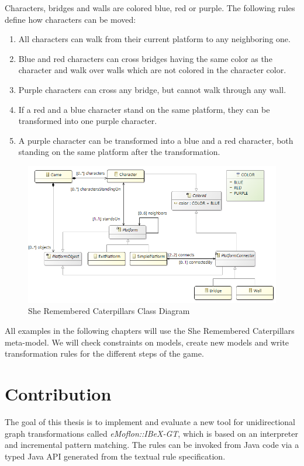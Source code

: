 Characters, bridges and walls are colored blue, red or purple. 
The following rules define how characters can be moved:
\begin{enumerate}
	\item All characters can walk from their current platform to any neighboring one.
	\item Blue and red characters can cross bridges having the same color as the character and walk over walls which are not colored in the character color.
	\item Purple characters can cross any bridge, but cannot walk through any wall.
	\item If a red and a blue character stand on the same platform, they can be transformed into one purple character.
	\item A purple character can be transformed into a blue and a red character, both standing on the same platform after the transformation.
\end{enumerate} 

\begin{figure}[h!]
	\centering
		\includegraphics[width=.9\linewidth]{../common/figures/she-remembered-caterpillars-class-diagram}
	\caption{She Remembered Caterpillars Class Diagram}
	\label{fig:she-remembered-caterpillars-class-diagram}
\end{figure}

\noindent
All examples in the following chapters will use the She Remembered Caterpillars meta-model.
We will check constraints on models, create new models and write transformation rules for the different steps of the game.

\section{Contribution}
The goal of this thesis is to implement and evaluate a new tool for unidirectional graph transformations called \textit{eMoflon::IBeX-GT}, which is based on an interpreter and incremental pattern matching.
The rules can be invoked from Java code via a typed Java API generated from the textual rule specification.

